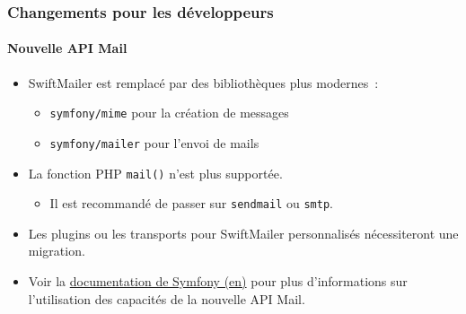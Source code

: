
\begin{frame}[fragile]
	\frametitle{Changements pour les développeurs}
	\framesubtitle{Nouvelle API Mail}

	\begin{itemize}
		\item SwiftMailer est remplacé par des bibliothèques plus modernes~: 

			\begin{itemize}
				\item \texttt{symfony/mime} pour la création de messages
				\item \texttt{symfony/mailer} pour l'envoi de mails
			\end{itemize}

		\item La fonction PHP \texttt{mail()} n'est plus supportée.

			\begin{itemize}\smaller
				\item[\ding{228}] Il est recommandé de passer sur \texttt{sendmail} ou \texttt{smtp}.
			\end{itemize}\normalsize

		\item Les plugins ou les transports pour SwiftMailer personnalisés nécessiteront une migration.

		\item Voir la \href{https://symfony.com/doc/current/mailer.html}{documentation de Symfony (en)}
			pour plus d'informations sur l'utilisation des capacités de la nouvelle API Mail.
	\end{itemize}

\end{frame}


